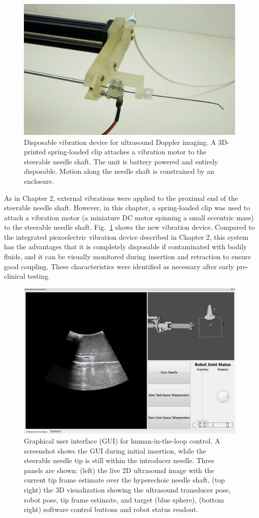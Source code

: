 \begin{figure}[!ht]
\centering
\includegraphics[width = 0.5\columnwidth]{./Images/Chapter5/Buzzer/Buzzer.jpg}%
\caption[Disposable vibration device]{Disposable vibration device for ultrasound Doppler imaging. A 3D-printed spring-loaded clip attaches a vibration motor to the steerable needle shaft. The unit is battery powered and entirely disposable. Motion along the needle shaft is constrained by an enclosure.}
\label{fig:Buzzer}
\end{figure}  

As in Chapter 2, external vibrations were applied to the proximal end of the steerable needle shaft. However, in this chapter, a spring-loaded clip was used to attach a vibration motor (a miniature DC motor spinning a small eccentric mass) to the steerable needle shaft. Fig.~\ref{fig:Buzzer} shows the new vibration device. Compared to the integrated piezoelectric vibration device described in Chapter 2, this system has the advantages that it is completely disposable if contaminated with bodily fluids, and it can be visually monitored during insertion and retraction to ensure good coupling. These characteristics were identified as necessary after early pre-clinical testing.

\begin{figure}[!t]
\centering
\includegraphics[width = \columnwidth]{./Images/Chapter5/GUI/GUI.jpg}%
\caption[Human-in-the-loop GUI]{Graphical user interface (GUI) for human-in-the-loop control. A screenshot shows the GUI during initial insertion, while the steerable needle tip is still within the introducer needle. Three panels are shown: (left) the live 2D ultrasound image with the current tip frame estimate over the hyperechoic needle shaft, (top right) the 3D visualization showing the ultrasound transducer pose, robot pose, tip frame estimate, and target (blue sphere), (bottom right) software control buttons and robot status readout.}
\label{fig:GUI}
\end{figure}  

